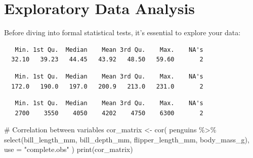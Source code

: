 \documentclass[
  letterpaper,
]{book}
\newenvironment{Shaded}{\begin{snugshade}}{\end{snugshade}}
\newcommand{\AttributeTok}[1]{\textcolor[rgb]{0.40,0.45,0.13}{#1}}
\newcommand{\CommentTok}[1]{\textcolor[rgb]{0.37,0.37,0.37}{#1}}
\newcommand{\FunctionTok}[1]{\textcolor[rgb]{0.28,0.35,0.67}{#1}}
\newcommand{\NormalTok}[1]{\textcolor[rgb]{0.00,0.23,0.31}{#1}}
\newcommand{\OtherTok}[1]{\textcolor[rgb]{0.00,0.23,0.31}{#1}}
\newcommand{\SpecialCharTok}[1]{\textcolor[rgb]{0.37,0.37,0.37}{#1}}
\newcommand{\StringTok}[1]{\textcolor[rgb]{0.13,0.47,0.30}{#1}}
\begin{document}
\section{Exploratory Data Analysis}\label{exploratory-data-analysis}

Before diving into formal statistical tests, it's essential to explore
your data:

\begin{Shaded}
\end{Shaded}

\begin{verbatim}
   Min. 1st Qu.  Median    Mean 3rd Qu.    Max.    NA's 
  32.10   39.23   44.45   43.92   48.50   59.60       2 
\end{verbatim}

\begin{Shaded}
\end{Shaded}

\begin{verbatim}
   Min. 1st Qu.  Median    Mean 3rd Qu.    Max.    NA's 
  172.0   190.0   197.0   200.9   213.0   231.0       2 
\end{verbatim}

\begin{Shaded}
\end{Shaded}

\begin{verbatim}
   Min. 1st Qu.  Median    Mean 3rd Qu.    Max.    NA's 
   2700    3550    4050    4202    4750    6300       2 
\end{verbatim}

\begin{Shaded}
\begin{Highlighting}[]
\CommentTok{\# Correlation between variables}
\NormalTok{cor\_matrix }\OtherTok{\textless{}{-}} \FunctionTok{cor}\NormalTok{(}
\NormalTok{  penguins }\SpecialCharTok{\%\textgreater{}\%} 
    \FunctionTok{select}\NormalTok{(bill\_length\_mm, bill\_depth\_mm, flipper\_length\_mm, body\_mass\_g),}
  \AttributeTok{use =} \StringTok{"complete.obs"}
\NormalTok{)}
\FunctionTok{print}\NormalTok{(cor\_matrix)}
\end{Highlighting}
\end{Shaded}
\end{document}
